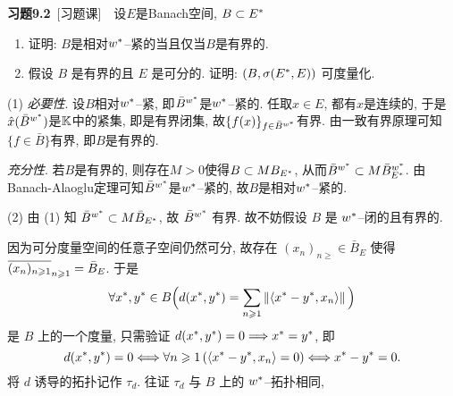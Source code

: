     \textbf{习题9.2}\ [习题课]\ \ 设$ E $是Banach空间, $ B\subset\Star{E} $
    \begin{enumerate}[(1)]
        \item 证明: $ B $是相对$ \Star{w} $--紧的当且仅当$ B $是有界的.
        \item 假设 $ B $ 是有界的且 $ E $ 是可分的. 证明: $ (B, \sigma(\Star{E}, E)) $ 可度量化.
    \end{enumerate}
    \begin{Proof}
    (1) \textsl{必要性}. 设$ B $相对$ \Star{w} $--紧, 即$ \bar{B}^{\Star{w}} $是$ \Star{w} $--紧的. 任取$ x\in E $, 都有$ \hat{x} $是连续的, 于是$ \hat{x}(\bar{B}^{\Star{w}}) $是$ \K $中的紧集, 即是有界闭集, 故$ \{ f(x) \}_{f\in \bar{B}^{\Star{w}}} $有界. 由一致有界原理可知$ \{ f\in\bar{B} \} $有界, 即$ B $是有界的.

    \textsl{充分性}. 若$ B $是有界的, 则存在$ M>0 $使得$ B\subset MB_{\Star{E}} $, 从而$ \bar{B}^{\Star{w}}\subset M\bar{B}_{\Star{E}}^{\Star{w}} $. 由Banach-Alaoglu定理可知$ \bar{B}^{\Star{w}} $是$ \Star{w} $--紧的, 故$ B $是相对$ \Star{w} $--紧的.

    (2) 由 (1) 知 $ \bar{B}^{\Star{w}}\subset M\bar{B}_{\Star{E}} $, 故 $ \bar{B}^{\Star{w}}  $ 有界. 故不妨假设 $ B $ 是 $ \Star{w} $--闭的且有界的.

    因为可分度量空间的任意子空间仍然可分, 故存在 $ (x_{n})_{n\geqslant}\in\bar{B}_{E} $ 使得 $ \baro{(x_{n})_{n\geqslant1}}_{n\geqslant1}=\bar{B}_{E} $. 于是
    \[
        \forall \Star{x}, \Star{y}\in B\Big(d(\Star{x}, \Star{y})=\sum_{n\geqslant1}\norm{\lrangle{\Star{x}-\Star{y}, x_{n}}}\Big)
    \]
    是 $ B $ 上的一个度量, 只需验证 $ d(\Star{x}, \Star{y})=0\Longrightarrow \Star{x}=\Star{y} $, 即
    \[
        d(\Star{x}, \Star{y})=0\Longleftrightarrow \forall n\geqslant1\,(\lrangle{\Star{x}-\Star{y}, x_{n}}=0)\Longleftrightarrow \Star{x}-\Star{y}=0.
    \]
    将 $ d $ 诱导的拓扑记作 $ \tau_{d} $. 往证 $ \tau_{d} $ 与 $ B $ 上的 $ \Star{w} $--拓扑相同,


\end{Proof}
